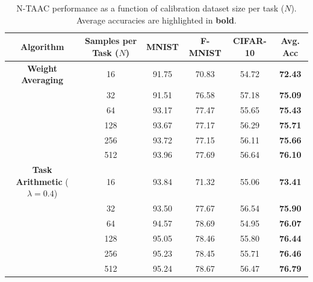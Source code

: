 \documentclass{article}
\theoremstyle{plain}
\theoremstyle{definition}
\theoremstyle{remark}
\begin{document}
\begin{table}[htbp]
\caption{N-TAAC performance as a function of calibration dataset size per task ($N$). Average accuracies are highlighted in \textbf{bold}.}
\label{tab-sample-efficiency}
\begin{center}
\begin{small}
\begin{sc}
\begin{tabular}{cccccc}
\toprule
Algorithm & Samples per Task ($N$) & MNIST & F-MNIST & CIFAR-10 & Avg. Acc \\
\midrule
\textbf{Weight Averaging} & 16 & 91.75 & 70.83 & 54.72 & \textbf{72.43} \\
& 32 & 91.51 & 76.58 & 57.18 & \textbf{75.09} \\
& 64 & 93.17 & 77.47 & 55.65 & \textbf{75.43} \\
& 128 & 93.67 & 77.17 & 56.29 & \textbf{75.71} \\
& 256 & 93.72 & 77.15 & 56.11 & \textbf{75.66} \\
& 512 & 93.96 & 77.69 & 56.64 & \textbf{76.10} \\
\midrule
\textbf{Task Arithmetic} ($\lambda=0.4$) & 16 & 93.84 & 71.32 & 55.06 & \textbf{73.41} \\
& 32 & 93.50 & 77.67 & 56.54 & \textbf{75.90} \\
& 64 & 94.57 & 78.69 & 54.95 & \textbf{76.07} \\
& 128 & 95.05 & 78.46 & 55.80 & \textbf{76.44} \\
& 256 & 95.23 & 78.45 & 55.71 & \textbf{76.46} \\
& 512 & 95.24 & 78.67 & 56.47 & \textbf{76.79} \\
\bottomrule
\end{tabular}
\end{sc}
\end{small}
\end{center}
\end{table}
\end{document}
